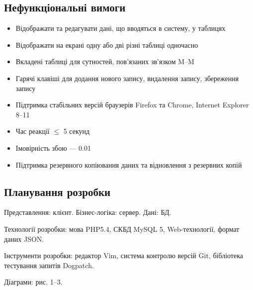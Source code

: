 \subsection{Нефункціональні вимоги}
\begin{itemize}
 \item Відображати та редагувати дані, що вводяться в систему, у таблицях
 \item Відображати на екрані одну або дві різні таблиці одночасно
 \item Вкладені таблиці для сутностей, пов'язаних зв'язком M--M
 \item Гарячі клавіші для додання нового запису, видалення запису, збереження запису
 \item Підтримка стабільних версій браузерів Firefox та Chrome, Internet Explorer 8--11
 \item Час реакції $\leqslant$ 5 секунд
 \item Імовірність збою --- 0.01
 \item Підтримка резервного копіювання даних та відновлення з резервних копій
\end{itemize}

\subsection{Планування розробки}
Представлення: клієнт. Бізнес-логіка: сервер. Дані: БД.

Технології розробки: мова PHP5.4, СКБД MySQL 5, Web-технології, формат даних JSON.

Інструменти розробки: редактор Vim, система контролю версій Git, бібліотека тестування запитів Dogpatch.

Діаграми: рис. 1--3.

